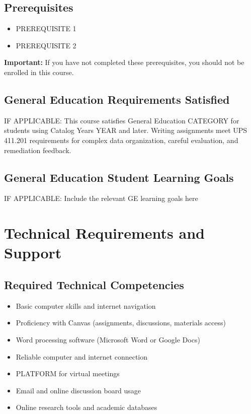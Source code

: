 \documentclass[12pt]{article}
\begin{document}
\subsection*{Prerequisites}
\begin{itemize}
\item PREREQUISITE 1
\item PREREQUISITE 2
\end{itemize}

\textbf{Important:} If you have not completed these prerequisites, you should not be enrolled in this course.

\subsection*{General Education Requirements Satisfied}
IF APPLICABLE: This course satisfies General Education CATEGORY for students using Catalog Years YEAR and later. Writing assignments meet UPS 411.201 requirements for complex data organization, careful evaluation, and remediation feedback.

\subsection*{General Education Student Learning Goals}
IF APPLICABLE: Include the relevant GE learning goals here

\section*{Technical Requirements and Support}

\subsection*{Required Technical Competencies}
\begin{itemize}
\item Basic computer skills and internet navigation
\item Proficiency with Canvas (assignments, discussions, materials access)
\item Word processing software (Microsoft Word or Google Docs)
\item Reliable computer and internet connection
\item PLATFORM for virtual meetings
\item Email and online discussion board usage
\item Online research tools and academic databases
\end{itemize}
\end{document}
